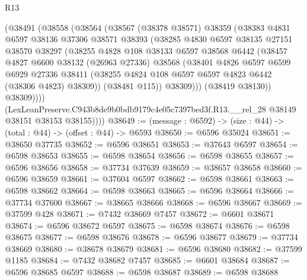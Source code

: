 \begin{lexlean}{R13}
\begin{coremodule}
            (@38491
              (@38558
                (@38564
                  (@38567
                    (@38378 @38571)
                    @38359
                    (@38383
                      @4831
                      @6597
                      @38136
                      @37306
                      @38571
                      @38393
                      (@38285
                        @4830
                        @6597
                        @38135
                        @27151
                        @38570
                        @38297
                        (@38255
                          @4828
                          @108
                          @38133
                          @6597
                          @38568
                          @6442
                          (@38457
                            @4827
                            @6600
                            @38132
                            (@26963 @27336)
                            @38568
                            (@38401
                              @4826
                              @6597
                              @6599
                              @6929
                              @27336
                              @38411
                              (@38255 @4824 @108 @6597 @6597 @4823 @6442 (@38306 @4823) @38309))
                            (@38481 @115))
                          @38309)))
                    (@38419 @38130))
                  @38309))))
          (LexLeanPreserve.C943b8de9b0bdb9179c4e05c7397bed3f.R13.__rel_28
            @38149
            @38151
            @38153
            @38155))))
@38649 := (message : @6592) -> (size : @44) -> (total : @44) -> (offset : @44) -> @6593
@38650 := @6596 @35024
@38651 := @38650 @37735
@38652 := @6596 @38651
@38653 := @37643 @6597
@38654 := @6598 @38653
@38655 := @6598 @38654
@38656 := @6598 @38655
@38657 := @6596 @38656
@38658 := @37734 @37639
@38659 := @38657 @38658
@38660 := @6596 @38659
@38661 := @37604 @6597
@38662 := @6598 @38661
@38663 := @6598 @38662
@38664 := @6598 @38663
@38665 := @6596 @38664
@38666 := @37734 @37600
@38667 := @38665 @38666
@38668 := @6596 @38667
@38669 := @37599 @428
@38671 := @7432 @38669 @7457
@38672 := @6601 @38671
@38674 := @6596 @38672 @6597
@38675 := @6598 @38674
@38676 := @6598 @38675
@38677 := @6598 @38676
@38678 := @6596 @38677
@38679 := @37734 @38669
@38680 := @38678 @38679
@38681 := @6596 @38680
@38682 := @37599 @1185
@38684 := @7432 @38682 @7457
@38685 := @6601 @38684
@38687 := @6596 @38685 @6597
@38688 := @6598 @38687
@38689 := @6598 @38688

\end{coremodule}
\end{lexlean}
